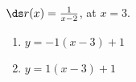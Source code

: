 {$\ds r(x) = \frac1{x-2}$, at $x=3$.
}
{\begin{enumerate}
\item		$y = -1(x-3)+1$
\item		$y = 1(x-3)+1$
\end{enumerate}
}
